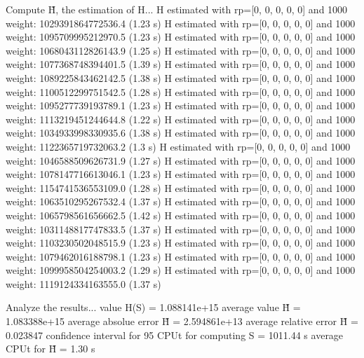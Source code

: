 Compute H̃, the estimation of H...
  H estimated with rp=[0, 0, 0, 0, 0] and 1000 weight:  1029391864772536.4  (1.23 s)
  H estimated with rp=[0, 0, 0, 0, 0] and 1000 weight:  1095709995212970.5  (1.23 s)
  H estimated with rp=[0, 0, 0, 0, 0] and 1000 weight:  1068043112826143.9  (1.25 s)
  H estimated with rp=[0, 0, 0, 0, 0] and 1000 weight:  1077368748394401.5  (1.39 s)
  H estimated with rp=[0, 0, 0, 0, 0] and 1000 weight:  1089225843462142.5  (1.38 s)
  H estimated with rp=[0, 0, 0, 0, 0] and 1000 weight:  1100512299751542.5  (1.28 s)
  H estimated with rp=[0, 0, 0, 0, 0] and 1000 weight:  1095277739193789.1  (1.23 s)
  H estimated with rp=[0, 0, 0, 0, 0] and 1000 weight:  1113219451244644.8  (1.22 s)
  H estimated with rp=[0, 0, 0, 0, 0] and 1000 weight:  1034933998330935.6  (1.38 s)
  H estimated with rp=[0, 0, 0, 0, 0] and 1000 weight:  1122365719732063.2  (1.3 s)
  H estimated with rp=[0, 0, 0, 0, 0] and 1000 weight:  1046588509626731.9  (1.27 s)
  H estimated with rp=[0, 0, 0, 0, 0] and 1000 weight:  1078147716613046.1  (1.23 s)
  H estimated with rp=[0, 0, 0, 0, 0] and 1000 weight:  1154741536553109.0  (1.28 s)
  H estimated with rp=[0, 0, 0, 0, 0] and 1000 weight:  1063510295267532.4  (1.37 s)
  H estimated with rp=[0, 0, 0, 0, 0] and 1000 weight:  1065798561656662.5  (1.42 s)
  H estimated with rp=[0, 0, 0, 0, 0] and 1000 weight:  1031148817747833.5  (1.37 s)
  H estimated with rp=[0, 0, 0, 0, 0] and 1000 weight:  1103230502048515.9  (1.23 s)
  H estimated with rp=[0, 0, 0, 0, 0] and 1000 weight:  1079462016188798.1  (1.23 s)
  H estimated with rp=[0, 0, 0, 0, 0] and 1000 weight:  1099958504254003.2  (1.29 s)
  H estimated with rp=[0, 0, 0, 0, 0] and 1000 weight:  1119124334163555.0  (1.37 s)

Analyze the results...
  value H(S)                  = 1.088141e+15 
  average value H̃             = 1.083388e+15 
  average absolue error H̃     = 2.594861e+13 
  average relative error H̃    = 0.023847 
  confidence interval for 95%
  CPUt for computing S         = 1011.44 s
  average CPUt for H̃           = 1.30 s

